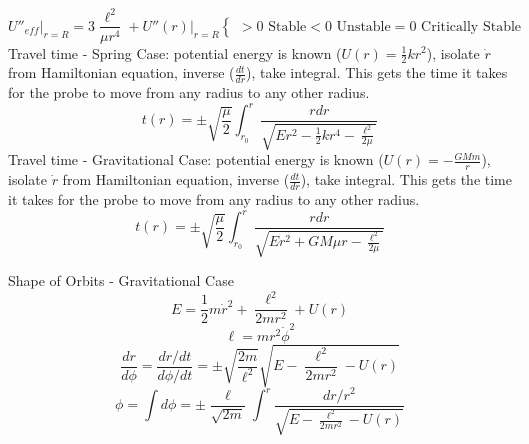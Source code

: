 \documentclass[12pt]{article}
\begin{document}
    \begin{equation}
        {U''}_{eff} \bigg|_{r=R} = 3 \frac{\ell^2}{\mu r^4} + {U''}(r) \bigg|_{r=R} 
        \begin{cases}
            > 0 \text{ Stable}
            < 0 \text{ Unstable}
            = 0 \text{ Critically Stable}
        \end{cases}
    \end{equation}
    Travel time - Spring Case: potential energy is known ($U(r) = \frac{1}{2} k r^2$), isolate $\dot{r}$ from Hamiltonian equation, inverse ($\frac{dt}{dr}$), take integral. This gets the time it takes for the probe to move from any radius to any other radius.
    \begin{equation}
        t(r) = \pm \sqrt{\frac{\mu}{2}} \int_{r_0}^r \frac{r dr}{\sqrt{E r^2 - \frac{1}{2} k r^4 - \frac{\ell^2}{2 \mu}}}
    \end{equation}
    Travel time - Gravitational Case: potential energy is known ($U(r) = -\frac{G M m}{r}$), isolate $\dot{r}$ from Hamiltonian equation, inverse ($\frac{dt}{dr}$), take integral. This gets the time it takes for the probe to move from any radius to any other radius.
    \begin{equation}
        t(r) = \pm \sqrt{\frac{\mu}{2}} \int_{r_0}^r \frac{r dr}{\sqrt{E r^2 + G M \mu r - \frac{\ell^2}{2 \mu}}}
    \end{equation}
    
    Shape of Orbits - Gravitational Case
    \[
        E = \frac{1}{2} m \dot{r}^2 + \frac{\ell^2}{2 m r^2} + U(r)
    \]
    \[
        \ell = m r^2 \dot{\phi}^2
    \]
    \[
        \frac{dr}{d\phi} = \frac{dr / dt}{d\phi / dt} = \pm \sqrt{\frac{2 m}{\ell^2}} \sqrt{E - \frac{\ell^2}{2 m r^2} - U(r)}
    \]
    \[
        \phi = \int d\phi = \pm \frac{\ell}{\sqrt{2m}} \int^r \frac{dr / r^2}{\sqrt{E - \frac{\ell^2}{2 m r^2} - U(r)}}
    \]
\end{document}
